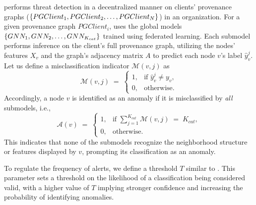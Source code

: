 \Sys performs threat detection in a decentralized manner on clients' provenance graphs (\( \{PGClient_{1}, PGClient_{2}, \ldots, \\ PGClient_{N}\} \)) in an organization. For a given provenance graph \(PGClient_{i}\), \Sys uses the global \gnnshort models \(\{GNN_1, \\ GNN_2, \ldots, GNN_{K_{cat}}\}\) trained using federated learning. Each submodel performs inference on the client's full provenance graph, utilizing the nodes' features \(X_v\) and the graph's adjacency matrix \(A\) to predict each node \(v\)'s label \(\hat{y}_v^j\). Let us define a misclassification indicator \(\mathcal{M}(v, j)\) as
\[
\mathcal{M}(v, j) \;=\;
\begin{cases}
1, & \text{if } \hat{y}_v^j \neq y_v,\\
0, & \text{otherwise}.
\end{cases}
\]
Accordingly, a node \(v\) is identified as an anomaly if it is misclassified by \emph{all} submodels, i.e.,
\[
\mathcal{A}(v) \;=\;
\begin{cases}
1, & \text{if } \sum_{j=1}^{K_{cat}} \mathcal{M}(v, j) \;=\; K_{cat},\\
0, & \text{otherwise}.
\end{cases}
\]
This indicates that none of the submodels recognize the neighborhood structure or features displayed by \(v\), prompting its classification as an anomaly.


To regulate the frequency of alerts, we define a threshold \(T\) similar to \flash. This parameter sets a threshold on the likelihood of a classification being considered valid, with a higher value of \(T\) implying stronger confidence and increasing the probability of identifying anomalies.
